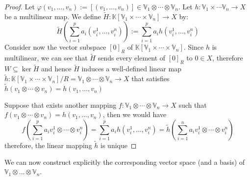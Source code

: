 \documentclass[11pt,a4paper,openright,oneside]{book}
\numberwithin{equation}{section}
\begin{document}
\begin{proof}
    Let $\varphi(v_1, \dots, v_n) := [(v_1, \dots, v_n)] \in \mathbb{V}_1 \otimes \cdots \otimes \mathbb{V}_n$. Let $h : \mathbb{V}_1 \times \cdots \mathbb{V}_n \rightarrow X$ be a
    multilinear map. We define $\tilde H : \mathbb{K}[\mathbb{V}_1 \times \cdots \times \mathbb{V}_n] \rightarrow X$ by:
    $$\tilde H \left( \sum_{i=1}^p a_i (v_i^1, \dots, v_i^n) \right) := \sum_{i=1}^p a_i h(v_i^1, \dots, v_i^n) $$
    Consider now the vector subspace $[0]_R$ of $\mathbb{K}[\mathbb{V}_1 \times \cdots \times \mathbb{V}_n]$.
    Since $h$ is multilinear, we can see that $\tilde H$ sends every element of $[0]_R$ to
    $0 \in X$, therefore $W \subseteq \ker{ \tilde H}$ and hence $\tilde H$ induces a well-defined linear map $\tilde h: \mathbb{K}[\mathbb{V}_1 \times \cdots \times \mathbb{V}_n]/R = \mathbb{V}_1 \otimes \cdots \otimes \mathbb{V}_n \rightarrow X$
    that satisfies $\tilde h (v_1 \otimes \cdots \otimes v_n) = h(v_1, \dots, v_n)$

    Suppose that exists another mapping $f : \mathbb{V}_1 \otimes \cdots \otimes \mathbb{V}_n \rightarrow X$ such that $f(v_1 \otimes \cdots \otimes v_n) = h(v_1, \dots, v_n)$, then we would have
    $$f \left( \sum_{i=1}^p a_i v_i^1 \otimes \cdots \otimes v_i^n \right) = \sum_{i=1}^p a_i h(v_i^1, \dots, v_i^n) = \tilde h \left( \sum_{i=1}^n a_i v_i^1 \otimes \cdots \otimes v_i^n \right)$$
    therefore, the linear mapping $\tilde h$ is unique
\end{proof}

We can now construct explicitly the corresponding vector space (and a basis) of ${\mathbb{V}_1 \otimes \dots \otimes \mathbb{V}_n}$.
\end{document}
